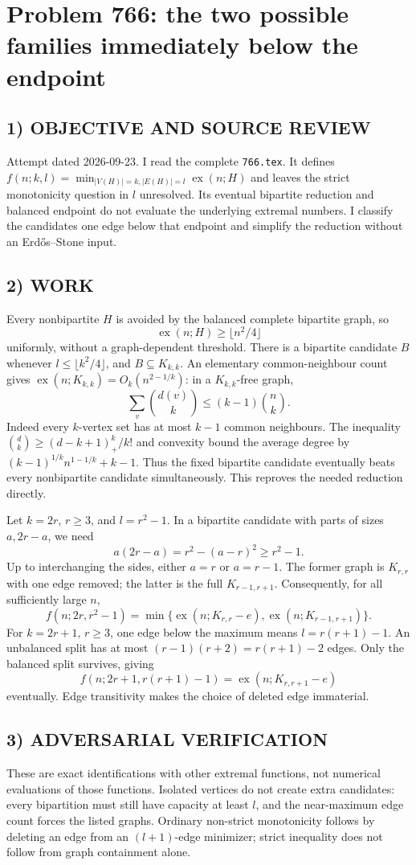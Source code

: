 \section{Problem 766: the two possible families immediately below the endpoint}
\subsection*{1) OBJECTIVE AND SOURCE REVIEW}
Attempt dated 2026-09-23. I read the complete \texttt{766.tex}. It defines $f(n;k,l)=\min_{|V(H)|=k,|E(H)|=l}\operatorname{ex}(n;H)$ and leaves the strict monotonicity question in $l$ unresolved. Its eventual bipartite reduction and balanced endpoint do not evaluate the underlying extremal numbers. I classify the candidates one edge below that endpoint and simplify the reduction without an Erd\H{o}s--Stone input.
\subsection*{2) WORK}
Every nonbipartite $H$ is avoided by the balanced complete bipartite graph, so
\[
\operatorname{ex}(n;H)\ge\lfloor n^2/4\rfloor
\]
uniformly, without a graph-dependent threshold. There is a bipartite candidate $B$ whenever $l\le\lfloor k^2/4\rfloor$, and $B\subseteq K_{k,k}$. An elementary common-neighbour count gives $\operatorname{ex}(n;K_{k,k})=O_k(n^{2-1/k})$: in a $K_{k,k}$-free graph,
\[
\sum_v\binom{d(v)}k\le(k-1)\binom nk.
\]
Indeed every $k$-vertex set has at most $k-1$ common neighbours. The inequality $\binom dk\ge(d-k+1)_+^k/k!$ and convexity bound the average degree by $(k-1)^{1/k}n^{1-1/k}+k-1$. Thus the fixed bipartite candidate eventually beats every nonbipartite candidate simultaneously. This reproves the needed reduction directly.

Let $k=2r$, $r\ge3$, and $l=r^2-1$. In a bipartite candidate with parts of sizes $a,2r-a$, we need
\[
a(2r-a)=r^2-(a-r)^2\ge r^2-1.
\]
Up to interchanging the sides, either $a=r$ or $a=r-1$. The former graph is $K_{r,r}$ with one edge removed; the latter is the full $K_{r-1,r+1}$. Consequently, for all sufficiently large $n$,
\[
f(n;2r,r^2-1)=\min\{\operatorname{ex}(n;K_{r,r}-e),
\operatorname{ex}(n;K_{r-1,r+1})\}.
\]
For $k=2r+1$, $r\ge3$, one edge below the maximum means $l=r(r+1)-1$. An unbalanced split has at most $(r-1)(r+2)=r(r+1)-2$ edges. Only the balanced split survives, giving
\[
f(n;2r+1,r(r+1)-1)=\operatorname{ex}(n;K_{r,r+1}-e)
\]
eventually. Edge transitivity makes the choice of deleted edge immaterial.
\subsection*{3) ADVERSARIAL VERIFICATION}
These are exact identifications with other extremal functions, not numerical evaluations of those functions. Isolated vertices do not create extra candidates: every bipartition must still have capacity at least $l$, and the near-maximum edge count forces the listed graphs. Ordinary non-strict monotonicity follows by deleting an edge from an $(l+1)$-edge minimizer; strict inequality does not follow from graph containment alone.
